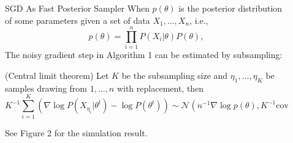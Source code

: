 \documentclass[final]{beamer}
\newlength{\sepwid}
\newlength{\onecolwid}
\newcommand{\N}{\mathscr{N}}
\newcommand{\cov}{\mathrm{cov}}
\begin{document}
\begin{frame}[t]
\begin{columns}[t]
\begin{column}{\onecolwid}

\begin{block}{SGD As Fast Posterior Sampler}
When $p(\theta)$ is the posterior distribution of some parameters given a set of data $X_1,\ldots, X_n$, i.e.,
$$
p(\theta) = \prod_{i=1}^n P(X_i|\theta) P(\theta),
$$
The noisy gradient step in Algorithm 1 can be estimated by subsampling:

(Central limit theorem)
Let $K$ be the subsampling size and $\eta_1,\ldots, \eta_K$ be samples drawing from $1,\ldots, n$ with replacement, then
\[
K^{-1}\sum_{i=1}^K (\nabla \log P(X_{\eta_i}|\theta^t) - \log P(\theta^t)) \sim \N(n^{-1} \nabla \log p(\theta) , K^{-1}\cov \nabla \log p(\theta)).
\]

See Figure 2 for the simulation result.

\end{block}


\end{column} %

\begin{column}{\sepwid}\end{column} %

\begin{column}{\onecolwid} %




\end{column}
\end{columns}
\end{frame}
\end{document}
